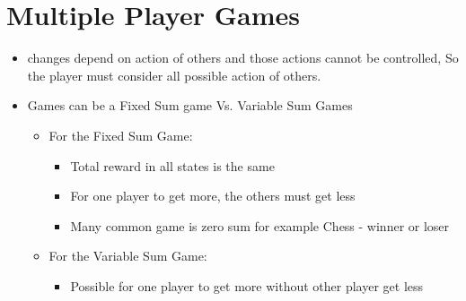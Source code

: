\documentclass{article}
\begin{document}
\section{Multiple Player Games}
\begin{itemize}
	\item changes depend on action of others and those actions cannot be controlled, So the player must consider all possible action of others.
	\item Games can be a Fixed Sum game Vs. Variable Sum Games\\
		\begin{itemize}
			\item For the Fixed Sum Game: 
			\begin{itemize}
				\item Total reward in all states is the same
				\item For one player to get more, the others must get less
				\item Many common game is zero sum for example Chess - winner or loser
			\end{itemize}
			\item For the Variable Sum Game:
				\begin{itemize}
					\item Possible for one player to get more without 	other player get less

				\end{itemize}	

		\end{itemize}

\end{itemize}
\end{document}
